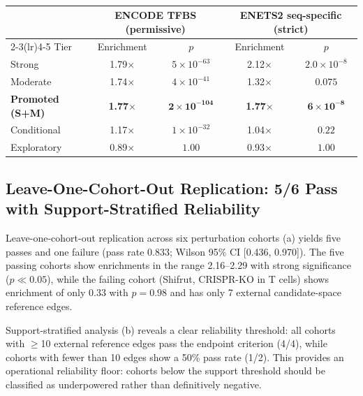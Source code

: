 \documentclass[11pt,a4paper]{article}
\begin{document}
{\begin{table}[t]
  \centering
  \caption{}
  \label{tab:external}
  \small
  \begin{tabular}{@{}lcccc@{}}
    \toprule
     & \multicolumn{2}{c}{ENCODE TFBS (permissive)} & \multicolumn{2}{c}{ENETS2 seq-specific (strict)} \\
    \cmidrule(lr){2-3}\cmidrule(lr){4-5}
    Tier & Enrichment & $p$ & Enrichment & $p$ \\
    \midrule
    Strong                    & 1.79$\times$ & $5\times10^{-63}$  & 2.12$\times$ & $2.0\times10^{-8}$ \\
    Moderate                  & 1.74$\times$ & $4\times10^{-41}$  & 1.32$\times$ & $0.075$ \\
    \textbf{Promoted (S+M)}   & \textbf{1.77$\times$} & $\mathbf{2\times10^{-104}}$ & \textbf{1.77$\times$} & $\mathbf{6\times10^{-8}}$ \\
    Conditional               & 1.17$\times$ & $1\times10^{-32}$  & 1.04$\times$ & $0.22$ \\
    Exploratory               & 0.89$\times$ & $1.00$             & 0.93$\times$ & $1.00$ \\
    \bottomrule
  \end{tabular}
\end{table}
}

\subsection{Leave-One-Cohort-Out Replication: 5/6 Pass with Support-Stratified Reliability}\label{sec:res-replication}

Leave-one-cohort-out replication across six perturbation cohorts (a) yields five passes and one failure (pass rate 0.833; Wilson 95\% CI [0.436, 0.970]).
The five passing cohorts show enrichments in the range 2.16--2.29 with strong significance ($p \ll 0.05$), while the failing cohort (Shifrut, CRISPR-KO in T cells) shows enrichment of only 0.33 with $p = 0.98$ and has only 7 external candidate-space reference edges.

Support-stratified analysis (b) reveals a clear reliability threshold: all cohorts with $\geq$10 external reference edges pass the endpoint criterion (4/4), while cohorts with fewer than 10 edges show a 50\% pass rate (1/2).
This provides an operational reliability floor: cohorts below the support threshold should be classified as underpowered rather than definitively negative.
\end{document}
